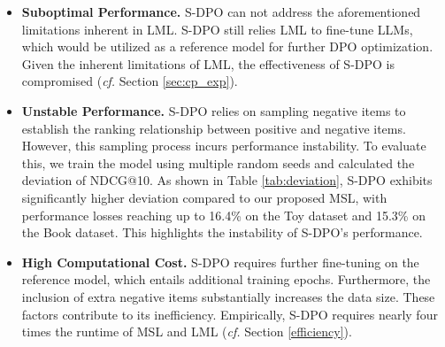 \documentclass[sigconf,natbib=true]{acmart}
\newcommand{\cf}{\emph{cf. }}
\begin{document}
\begin{itemize}[left=5pt]
\item \textbf{Suboptimal Performance.} S-DPO can not address the aforementioned limitations inherent in LML. S-DPO still relies LML to fine-tune LLMs, which would be utilized as a reference model for further DPO optimization. Given the inherent limitations of LML, the effectiveness of S-DPO
is compromised (\cf Section \ref{sec:cp_exp}).

\item \textbf{Unstable Performance.} S-DPO relies on sampling negative items to establish the ranking relationship between positive and negative items. However, this sampling process incurs performance instability. To evaluate this, we train the model using multiple random seeds and calculated the deviation of NDCG@10. 
As shown in Table \ref{tab:deviation}, S-DPO exhibits significantly higher deviation compared to our proposed MSL, with performance losses reaching up to 16.4\% on the Toy dataset and 15.3\% on the Book dataset. This highlights the instability of S-DPO's performance.
\item \textbf{High Computational Cost.} S-DPO requires further fine-tuning on the reference model, which entails additional training epochs. Furthermore, the inclusion of extra negative items substantially increases the data size. These factors contribute to its inefficiency. Empirically, S-DPO requires nearly four times the runtime of MSL and LML (\cf Section \ref{efficiency}).

\end{itemize}
\end{document}
